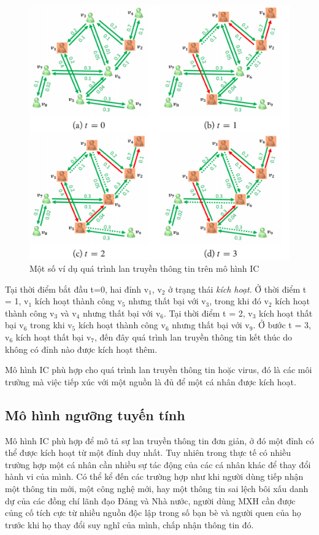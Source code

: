 		\begin{center}
			\begin{figure}[htp]
				\begin{center}
					\includegraphics [scale=.5]{picture/Hinh2_1}
				\end{center}
				\caption{Một số ví dụ quá trình lan truyền thông tin trên mô hình IC}
				\label{refhinh2_1}
			\end{figure}
		\end{center}
	Tại thời điểm bắt đầu t=0, hai đỉnh v$_{1}$, v$_{2}$ ở trạng thái {\itshape kích hoạt}. Ở thời điểm t = 1, v$_{1}$ kích hoạt thành công v$_{5}$ nhưng thất bại với v$_{3}$, trong khi đó v$_{2}$ kích hoạt thành công v$_{3}$ và v$_{4}$ nhưng thất bại với v$_{6}$. Tại thời điểm t = 2, v$_{3}$ kích hoạt thất bại v$_{6}$ trong khi v$_{5}$ kích hoạt thành công v$_{6}$ nhưng thất bại với v$_{9}$. Ở bước t = 3, v$_{6}$ kích hoạt thất bại v$_{7}$, đến đây quá trình lan truyền thông tin kết thúc do không có đỉnh nào được kích hoạt thêm.
	
	Mô hình IC phù hợp cho quá trình lan truyền thông tin hoặc virus, đó là các môi trường mà việc tiếp xúc với một nguồn là đủ để một cá nhân được kích hoạt.
	
	\subsection{Mô hình ngưỡng tuyến tính}
	Mô hình IC phù hợp để mô tả sự lan truyền thông tin đơn giản, ở đó một đỉnh có thể được kích hoạt từ một đỉnh duy nhất. Tuy nhiên trong thực tế có nhiều trường hợp một cá nhân cần nhiều sự tác động của các cá nhân khác để thay đổi hành vi của mình. Có thể kể đến các trường hợp như khi người dùng tiếp nhận một thông tin mới, một công nghệ mới, hay một thông tin sai lệch bôi xấu danh dự của các đồng chí lãnh đạo Đảng và Nhà nước, người dùng MXH cần được củng cố tích cực từ nhiều nguồn độc lập trong số bạn bè và người quen của họ trước khi họ thay đổi suy nghĩ của mình, chấp nhận thông tin đó.
	
